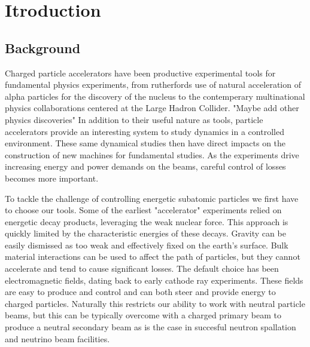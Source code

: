 \chapter{Itroduction} \label{chap:intro}

\section{Background} \label{sec:back}
Charged particle accelerators have been productive experimental tools for fundamental physics experiments, from rutherfords use of natural acceleration of alpha particles for the discovery of the nucleus to the contemperary multinational physics collaborations centered at the Large Hadron Collider. "Maybe add other physics discoveries" In addition to their useful nature as tools, particle accelerators provide an interesting system to study dynamics in a controlled environment. These same dynamical studies then have direct impacts on the construction of new machines for fundamental studies. As the experiments drive increasing energy and power demands on the beams, careful control of losses becomes more important.

To tackle the challenge of controlling energetic subatomic particles we first have to choose our tools. Some of the earliest "accelerator" experiments relied on energetic decay products, leveraging the weak nuclear force. This approach is quickly limited by the characteristic energies of these decays. Gravity can be easily dismissed as too weak and effectively fixed on the earth's surface. Bulk material interactions can be used to affect the path of particles, but they cannot accelerate and tend to cause significant losses. The default choice has been electromagnetic fields, dating back to early cathode ray experiments. These fields are easy to produce and control and can both steer and provide energy to charged particles. Naturally this restricts our ability to work with neutral particle beams, but this can be typically overcome with a charged primary beam to produce a neutral secondary beam as is the case in succesful neutron spallation and neutrino beam facilities.

